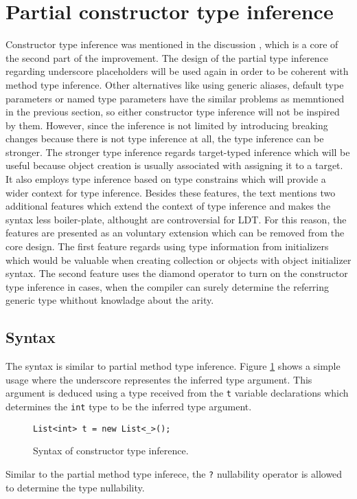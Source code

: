 \section{Partial constructor type inference}

Constructor type inference was mentioned in the discussion \cite{online:CtorTInf}, which is a core of the second part of the improvement.
The design of the partial type inference regarding underscore placeholders will be used again in order to be coherent with method type inference.
Other alternatives like using generic aliases, default type parameters or named type parameters have the similar problems as memntioned in the previous section, so either constructor type inference will not be inspired by them.
However, since the inference is not limited by introducing breaking changes because there is not type inference at all, the type inference can be stronger.
The stronger type inference regards target-typed inference which will be useful because object creation is usually associated with assigning it to a target.
It also employs type inference based on type constrains which will provide a wider context for type inference.
Besides these features, the text mentions two additional features which extend the context of type inference and makes the syntax less boiler-plate, althought are controversial for \ac{LDT}.
For this reason, the features are presented as an voluntary extension which can be removed from the core design.
The first feature regards using type information from initializers which would be valuable when creating collection or objects with object initializer syntax.
The second feature uses the diamond operator to turn on the constructor type inference in cases, when the compiler can surely determine the referring generic type whithout knowladge about the arity. 

\subsection{Syntax}

The syntax is similar to partial method type inference.
Figure \ref{img56:constructorTypeInferenceExample} shows a simple usage where the underscore representes the inferred type argument.
This argument is deduced using a type received from the \texttt{t} variable declarations which determines the \texttt{int} type to be the inferred type argument.
\begin{figure}[h!]
\begin{lstlisting}[style=csharp, mathescape=true]
List<int> t = new List<_>();
\end{lstlisting}
\caption{Syntax of constructor type inference.}
\label{img56:constructorTypeInferenceExample}
\end{figure}
\par
Similar to the partial method type inferece, the \texttt{?} nullability operator is allowed to determine the type nullability.

